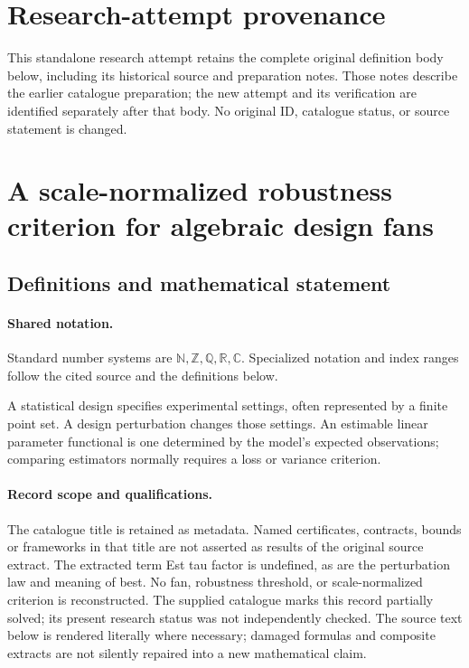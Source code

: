 \documentclass[11pt]{article}
\begin{document}
\section*{Research-attempt provenance}
This standalone research attempt retains the complete original definition body below,
including its historical source and preparation notes. Those notes describe the
earlier catalogue preparation; the new attempt and its verification are identified
separately after that body. No original ID, catalogue status, or source statement is changed.

\section{A scale-normalized robustness criterion for algebraic design fans}\label{statement}

\subsection{Definitions and mathematical statement}

\paragraph{Shared notation.}Standard number systems are $\mathbb N,\mathbb Z,\mathbb Q,\mathbb R,\mathbb C$. Specialized notation and index ranges follow the cited source and the definitions below.


A statistical design specifies experimental settings, often represented by a finite point set. A design perturbation changes those settings. An estimable linear parameter functional is one determined by the model's expected observations; comparing estimators normally requires a loss or variance criterion.
\paragraph{Record scope and qualifications.}
The catalogue title is retained as metadata. Named certificates, contracts, bounds or frameworks in that title are not asserted as results of the original source extract.
The extracted term Est tau factor is undefined, as are the perturbation law and meaning of best. No fan, robustness threshold, or scale-normalized criterion is reconstructed. The supplied catalogue marks this record partially solved; its present research status was not independently checked.
The source text below is rendered literally where necessary; damaged formulas and composite extracts are not silently repaired into a new mathematical claim.
\end{document}
